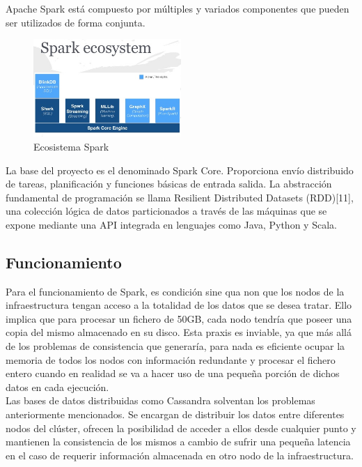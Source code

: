 Apache Spark está compuesto por múltiples y variados componentes que pueden ser utilizados de forma conjunta.\\

\begin{figure}[h]
	\centering
	\includegraphics[width=0.5\textwidth]{Ilustraciones/spark_ecosystem.png}
	\caption{Ecosistema Spark}
	\label{fig:ipanel}
\end{figure}

La base del proyecto es el denominado Spark Core. Proporciona envío distribuido de tareas, planificación y funciones básicas de entrada salida. La abstracción fundamental de programación se llama Resilient Distributed Datasets (RDD)[11], una colección lógica de datos particionados a través de las máquinas que se expone mediante una API integrada en lenguajes como Java, Python y Scala.\\

\subsection{Funcionamiento}

Para el funcionamiento de Spark, es condición sine qua non que los nodos de la infraestructura tengan acceso a la totalidad de los datos que se desea tratar. Ello implica que para procesar un fichero de 50GB, cada nodo tendría que poseer una copia del mismo almacenado en su disco. Esta praxis es inviable, ya que más allá de los problemas de consistencia que generaría, para nada es eficiente ocupar la memoria de todos los nodos con información redundante y procesar el fichero entero cuando en realidad se va a hacer uso de una pequeña porción de dichos datos en cada ejecución.\\

Las bases de datos distribuidas como Cassandra solventan los problemas anteriormente mencionados. Se encargan de distribuir los datos entre diferentes nodos del clúster, ofrecen la posibilidad de acceder a ellos desde cualquier punto y mantienen la consistencia de los mismos a cambio de sufrir una pequeña latencia en el caso de requerir información almacenada en otro nodo de la infraestructura.\\ 

